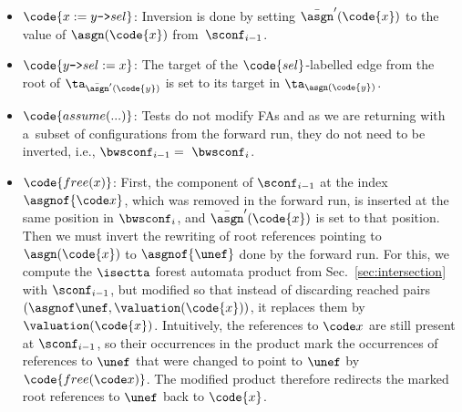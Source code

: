 {\begin{itemize}
  \item $\code{x := y\text{\texttt{->}}sel}$:
Inversion is done by setting $\bar\asgn'(\code{x})$ to the value of
$\asgn(\code{x})$ from~$\sconf_{i-1}$.
%

  \item $\code{y\text{\texttt{->}}sel := x}$:
The target of the $\code{sel}$-labelled edge from the root of
$\ta_{\bar\asgn'(\code{y})}$ is set to its target in $\ta_{\asgn(\code{y})}$.
 \item $\code{assume(...)}$: Tests do not modify FAs and as we are returning with a~subset of configurations from the forward run, they do not need to be inverted,
 i.e., $\bwsconf_{i-1} =~\bwsconf_{i}$.
  \item $\code{free(x)}$:
First, the component of $\sconf_{i-1}$ at the index $\asgnof{\code x}$, which was
removed in the forward run, is inserted at the same position in $\bwsconf_{i}$, and
$\bar\asgn'(\code{x})$ is set to that position.
%
Then we must invert the rewriting of root references pointing to $\asgn(\code{x})$ to $\asgnof{\unef}$ done by the forward run.
For this, we compute the $\isectta$ forest automata product from Sec.~\ref{sec:intersection} with $\sconf_{i-1}$, but modified so that 
instead of discarding reached pairs $(\asgnof\unef,\valuation(\code{x}))$, 
it replaces them by $\valuation(\code{x})$.
%
Intuitively, the references to $\code x$ are still present at $\sconf_{i-1}$,
so their occurrences in the product mark the occurrences of references to $\unef$ 
that were changed to point to $\unef$ by $\code{free(\code x)}$. The modified product therefore 
redirects  
the marked root references to $\unef$ back to $\code{x}$.


\end{itemize}}
